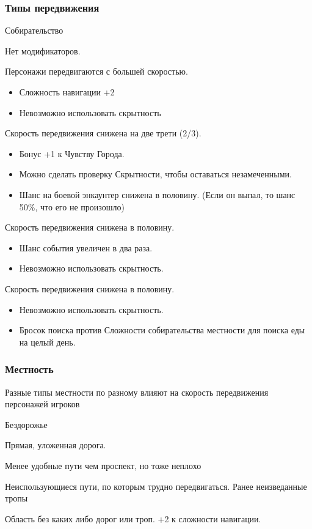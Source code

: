 \subsubsection*{Типы передвижения}
\begin{mydescription}{Собирательство}
  \item[Спокойное] Нет модификаторов.
  \item[Спешка] Персонажи передвигаются с большей скоростью.
  \begin{itemize}
    \item Сложность навигации +2
    \item Невозможно использовать скрытность
  \end{itemize}
  \item[Осторожное] Скорость передвижения снижена на две трети (2/3).
  \begin{itemize}
    \item Бонус +1 к Чувству Города.
    \item Можно сделать проверку Скрытности, чтобы оставаться незамеченными.
    \item Шанс на боевой энкаунтер снижена в половину. (Если он выпал, то шанс 50\%, что его не произошло)
  \end{itemize}
  \item[Исследование] Скорость передвижения снижена в половину.
  \begin{itemize}
    \item Шанс события увеличен в два раза.
    \item Невозможно использовать скрытность.
  \end{itemize}
  \item[Собирательство] Скорость передвижения снижена в половину. 
  \begin{itemize}
    \item Невозможно использовать скрытность.
    \item Бросок поиска против Сложности собирательства местности для поиска еды на целый день.
  \end{itemize}
\end{mydescription}

\subsubsection*{Местность}

Разные типы местности по разному влияют на скорость передвижения персонажей игроков

\begin{mydescription}{Бездорожье}
  \item[Проспект] Прямая, уложенная дорога.
  \item[Дорога] Менее удобные пути чем проспект, но тоже неплохо
  \item[Тропа] Неиспользующиеся пути, по которым трудно передвигаться. Ранее неизведанные тропы 
  \item[Бездорожье] Область без каких либо дорог или троп. +2 к сложности навигации.
\end{mydescription}

